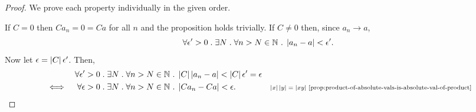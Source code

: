 \documentclass[../MathsNotesBase.tex]{subfiles}
\begin{document}
{	
		\nl[40]
		\begin{proof}
			We prove each property individually in the given order.
			
			If $ C = 0 $ then $ Ca_n = 0 = Ca $ for all $n$ and the proposition holds trivially. If $ C \neq 0 $ then, since $a_n \to a$,
			\[ \forall \epsilon' > 0 \;.\; \exists N \;.\; \forall n > N \in \mathbb{N}^{} \;.\; \left\lvert a_n - a\right\rvert < \epsilon'. \]
			Now let $ \epsilon = \left\lvert C\right\rvert\epsilon' $. Then,
			\begin{align*}
				&& \forall \epsilon' > 0 \;.\; \exists N \;.\; \forall n > N \in \mathbb{N}^{} &\;.\; \left\lvert C\right\rvert\left\lvert a_n - a\right\rvert < \left\lvert C\right\rvert\epsilon' = \epsilon  \\
				&\iff & \forall \epsilon > 0 \;.\; \exists N \;.\; \forall n > N \in \mathbb{N}^{} &\;.\; \left\lvert Ca_n - Ca\right\rvert < \epsilon. &\text{\scriptsize{$\left\lvert x\right\rvert\left\lvert y\right\rvert = \left\lvert xy\right\rvert$ \ref{prop:product-of-absolute-vals-is-absolute-val-of-product}}} \\
			\end{align*}
			

\end{proof}}
\end{document}
